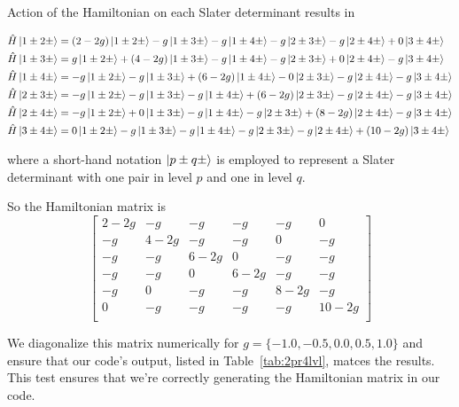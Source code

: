 \documentclass[11pt]{article}
\begin{document}

Action of the Hamiltonian on each Slater determinant results in

\begin{align*}
&\hat{H}\ket{1\pm2\pm}=(2-2g)\ket{1\pm2\pm}-g\ket{1\pm3\pm}-g\ket{1\pm4\pm}-g\ket{2\pm3\pm}-g\ket{2\pm4\pm}+0\ket{3\pm4\pm}   \\
&\hat{H}\ket{1\pm3\pm}=g\ket{1\pm2\pm}+(4-2g)\ket{1\pm3\pm}-g\ket{1\pm4\pm}-g\ket{2\pm3\pm}+0\ket{2\pm4\pm}-g\ket{3\pm4\pm}   \\
&\hat{H}\ket{1\pm4\pm}=-g\ket{1\pm2\pm}-g\ket{1\pm3\pm}+(6-2g)\ket{1\pm4\pm}-0\ket{2\pm3\pm}-g\ket{2\pm4\pm}-g\ket{3\pm4\pm}   \\
&\hat{H}\ket{2\pm3\pm}=-g\ket{1\pm2\pm}-g\ket{1\pm3\pm}-g\ket{1\pm4\pm}+(6-2g)\ket{2\pm3\pm}-g\ket{2\pm4\pm}-g\ket{3\pm4\pm}   \\ 
&\hat{H}\ket{2\pm4\pm}=-g\ket{1\pm2\pm}+0\ket{1\pm3\pm}-g\ket{1\pm4\pm}-g\ket{2\pm3\pm}+(8-2g)\ket{2\pm4\pm}-g\ket{3\pm4\pm}   \\
&\hat{H}\ket{3\pm4\pm}=0\ket{1\pm2\pm}-g\ket{1\pm3\pm}-g\ket{1\pm4\pm}-g\ket{2\pm3\pm}-g\ket{2\pm4\pm}+(10-2g)\ket{3\pm4\pm}   
\end{align*}


where a short-hand notation $\ket{p \pm q \pm}$ is employed to represent a Slater determinant with one pair in level $p$ and one in level $q$.

So the Hamiltonian matrix is
\[
\begin{bmatrix}
2-2g   &  -g   &   -g   &   -g    &   -g    &    0    \\
  -g   &4-2g   &   -g   &   -g    &    0    &   -g    \\
  -g   &  -g   & 6-2g   &    0    &   -g    &   -g    \\
  -g   &  -g   &   0   & 6-2g    &   -g    &   -g    \\
  -g   &   0   &   -g   &   -g    & 8-2g    &   -g    \\
   0   &  -g   &   -g   &   -g    &   -g    & 10-2g    \\
\end{bmatrix}
\]

We diagonalize this matrix numerically for $g=\{ -1.0, -0.5, 0.0, 0.5, 1.0 \}$ and ensure that our code's output, listed in Table~\ref{tab:2pr4lvl}, matces the results. This test ensures that we're correctly generating the Hamiltonian matrix in our code.
\end{document}
